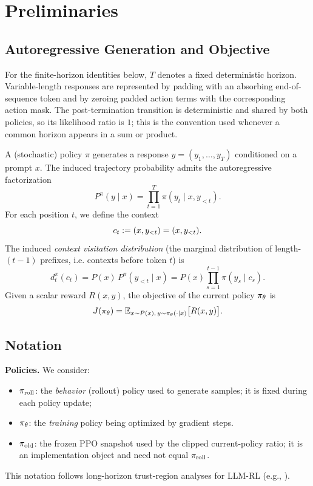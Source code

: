 \section{Preliminaries}
\label{sec:preliminaries}

\subsection{Autoregressive Generation and Objective}

For the finite-horizon identities below, $T$ denotes a fixed deterministic horizon. Variable-length responses are represented by padding
with an absorbing end-of-sequence token and by zeroing padded action terms with the corresponding action mask. The post-termination
transition is deterministic and shared by both policies, so its likelihood ratio is $1$; this is the convention used whenever a common
horizon appears in a sum or product.

A (stochastic) policy $\pi$ generates a response $y = (y_1, \ldots, y_T)$ conditioned on a prompt $x$. The induced trajectory
probability admits the autoregressive factorization
\begin{equation*}
    P^{\pi}(y \mid x) = \prod_{t=1}^T \pi(y_t \mid x, y_{<t}).
\end{equation*}
For each position $t$, we define the context
\begin{equation*}
    c_t := (x, y_{<t}) = (x, y_{<t}).
\end{equation*}
The induced \emph{context visitation distribution} (the marginal distribution of length-$(t-1)$ prefixes, i.e. contexts before token $t$) is
\begin{equation*}
    d_t^{\pi}(c_t) = P(x)\, P^{\pi}(y_{<t} \mid x) = P(x) \prod_{s=1}^{t-1} \pi(y_s \mid c_s).
\end{equation*}
Given a scalar reward $R(x, y)$, the objective of the current policy $\pi_{\theta}$ is
\begin{equation*}
    J(\pi_{\theta}) = \mathbb{E}_{x \sim P(x),\, y \sim \pi_{\theta}(\cdot|x)}\big[R(x, y)\big].
\end{equation*}

\subsection{Notation}

\textbf{Policies.} We consider:
\begin{itemize}
    \item $\pi_{\mathrm{roll}}$: the \emph{behavior} (rollout) policy used to generate samples; it is fixed during each policy update;
    \item $\pi_{\theta}$: the \emph{training} policy being optimized by gradient steps.
    \item $\pi_{\mathrm{old}}$: the frozen PPO snapshot used by the clipped current-policy
    ratio; it is an implementation object and need not equal $\pi_{\mathrm{roll}}$.
\end{itemize}
This notation follows long-horizon trust-region analyses for LLM-RL (e.g., \citet{li2025trm}).

